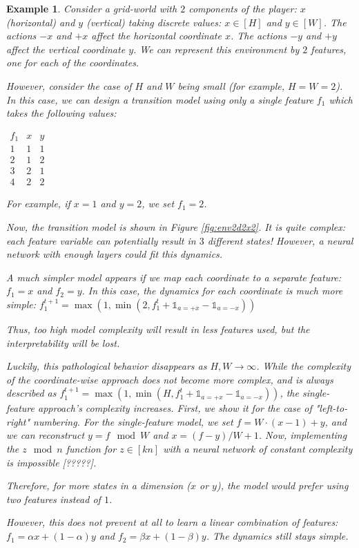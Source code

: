 \documentclass[a4paper,11pt,oneside]{report}
\newtheorem{example}{Example}[section]
\begin{document}
\begin{example}
    Consider a grid-world with $2$ components of the player: $x$ (horizontal) and $y$ (vertical) taking discrete values: $x\in [H]$ and $y\in [W]$. The actions $-x$ and $+x$ affect the horizontal coordinate $x$. The actions $-y$ and $+y$ affect the vertical coordinate $y$. We can represent this environment by $2$ features, one for each of the coordinates.

    However, consider the case of $H$ and $W$ being small (for example, $H=W=2$). In this case, we can design a transition model using only a single feature $f_1$ which takes the following values:

    $
    \begin{array}{ccc}
        f_1 & x & y \\
        1 & 1 & 1 \\
        2 & 1 & 2 \\
        3 & 2 & 1 \\
        4 & 2 & 2
    \end{array}
    $

    For example, if $x=1$ and $y=2$, we set $f_1=2$.

    Now, the transition model is shown in Figure \ref{fig:env2d2x2}. It is quite complex: each feature variable can potentially result in $3$ different states! However, a neural network with enough layers could fit this dynamics.

    A much simpler model appears if we map each coordinate to a separate feature: $f_1=x$ and $f_2=y$. In this case, the dynamics for each coordinate is much more simple:
    $f_1^{t+1}=\max(1, \min(2, f_1^t+\mathds 1_{a=+x}-\mathds 1_{a=-x}))$

    Thus, too high model complexity will result in less features used, but the interpretability will be lost.

    Luckily, this pathological behavior disappears as $H, W\to\infty$. While the complexity of the coordinate-wise approach does {\em not} become more complex, and is always described as $f_1^{t+1}=\max(1, \min(H, f_1^t+\mathds 1_{a=+x}-\mathds 1_{a=-x}))$, the single-feature approach's complexity increases. First, we show it for the case of "left-to-right" numbering.
    For the single-feature model, we set $f=W\cdot (x - 1)+y$, and we can reconstruct $y=f\mod W$ and $x=(f-y)/W+1$.
    Now, implementing the $z\mod n$ function for $z\in [kn]$ with a neural network of constant complexity is impossible [?????].


    Therefore, for more states in a dimension ($x$ or $y$), the model would prefer using two features instead of $1$.

    However, this does not prevent at all to learn a linear combination of features: $f_1=\alpha x+(1-\alpha)y$ and $f_2=\beta x+(1-\beta)y$. The dynamics still stays simple.
\end{example}
\end{document}
